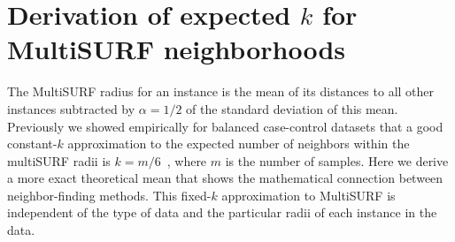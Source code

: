 \documentclass[10pt,letterpaper]{article}\usepackage[]{graphicx}\usepackage[]{color}
\begin{document}
\section{Derivation of expected \texorpdfstring{$k$}{} for MultiSURF neighborhoods}\label{sec:expected-k}
The MultiSURF radius for an instance is the mean of its distances to all other instances subtracted by $\alpha=1/2$ of the standard deviation of this mean. Previously we showed empirically for balanced case-control datasets that a good constant-$k$ approximation to the expected number of neighbors within the multiSURF radii is $k=m/6$~\cite{stir}, where $m$ is the number of samples. Here we derive a more exact theoretical mean that shows the mathematical connection between neighbor-finding methods. This fixed-$k$ approximation to MultiSURF is independent of the type of data and the particular radii of each instance in the data.
%
\end{document}
